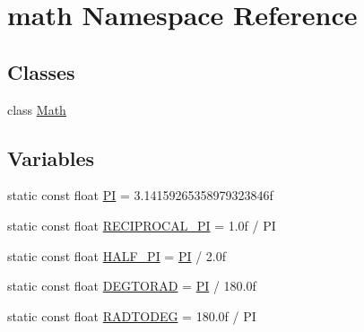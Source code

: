 \hypertarget{namespacemath}{\section{math Namespace Reference}
\label{namespacemath}
}
\subsection*{Classes}
\begin{DoxyCompactItemize}
\item 
class \hyperlink{classmath_1_1Math}{Math}
\end{DoxyCompactItemize}
\subsection*{Variables}
\begin{DoxyCompactItemize}
\item 
static const float \hyperlink{namespacemath_a6bc2e46a09ced59adc7ca762c21672e9}{P\-I} = 3.\-14159265358979323846f
\item 
static const float \hyperlink{namespacemath_a4ec943d35c300759d313db7a5c9a28ca}{R\-E\-C\-I\-P\-R\-O\-C\-A\-L\-\_\-\-P\-I} = 1.\-0f / P\-I
\item 
static const float \hyperlink{namespacemath_ab0c0d4b652877ea23c84cbd2ceaba14f}{H\-A\-L\-F\-\_\-\-P\-I} = \hyperlink{namespacemath_a6bc2e46a09ced59adc7ca762c21672e9}{P\-I} / 2.\-0f
\item 
static const float \hyperlink{namespacemath_a587d3c31fcbb87c5ccd1d9bb53a001ab}{D\-E\-G\-T\-O\-R\-A\-D} = \hyperlink{namespacemath_a6bc2e46a09ced59adc7ca762c21672e9}{P\-I} / 180.\-0f
\item 
static const float \hyperlink{namespacemath_a16c58a21197921edbdf61706b7520088}{R\-A\-D\-T\-O\-D\-E\-G} = 180.\-0f / P\-I
\end{DoxyCompactItemize}



